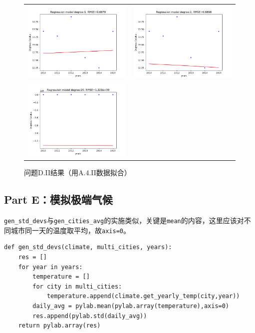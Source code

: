 \documentclass[logo,reportComp]{thesis}
\begin{document}
\begin{figure}[H]
\centering
\begin{tabular}{cc}
\includegraphics[width=0.5\linewidth]{fig/DIII-1.png}&
\includegraphics[width=0.5\linewidth]{fig/DIII-2.png}\\
\includegraphics[width=0.5\linewidth]{fig/DIII-3.png}
\end{tabular}
\caption{问题D.II结果（用A.4.II数据拟合）}
\label{fig:dii}
\end{figure}

\subsection*{Part E：模拟极端气候}
\verb'gen_std_devs'与\verb'gen_cities_avg'的实施类似，关键是\verb'mean'的内容，这里应该对不同城市同一天的温度取平均，故\verb'axis=0'。
\begin{lstlisting}
def gen_std_devs(climate, multi_cities, years):
    res = []
    for year in years:
        temperature = []
        for city in multi_cities:
            temperature.append(climate.get_yearly_temp(city,year))
        daily_avg = pylab.mean(pylab.array(temperature),axis=0)
        res.append(pylab.std(daily_avg))
    return pylab.array(res)
\end{lstlisting}
\end{document}
